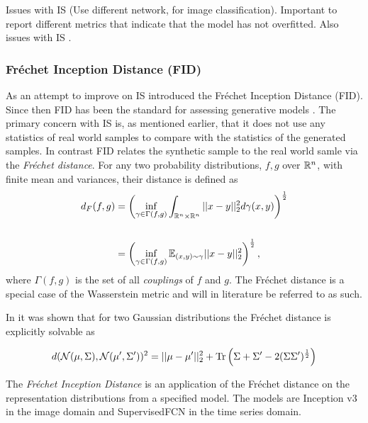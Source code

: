 \documentclass[../../thesis.tex]{subfiles}
\begin{document}
Issues with IS \cite{barratt2018note} (Use different network, for image classification).  Important to report different metrics that indicate that the model has not overfitted. 
Also issues with IS \cite{borji2021pros}.\newline

\subsubsection{Fréchet Inception Distance (FID)}
As an attempt to improve on IS \cite{heusel2018gans} introduced the Fréchet Inception Distance (FID). Since then FID has been the standard for assessing generative models \cite{borji2021pros}.\newline
The primary concern with IS is, as mentioned earlier, that it does not use any statistics of real world samples to compare with the statistics of the generated samples. In contrast FID relates the synthetic sample to the real world samle via the \textit{Fréchet distance}. For any two probability distributions, $f,g$ over $\mathbb{R}^n$, with finite mean and variances, their  distance is defined as 
\begin{equation}
    \begin{aligned}
        d_F(f,g) &= \left(\inf_{\gamma \in \Gamma(f,g)} \int_{\mathbb{R}^n\times\mathbb{R}^n}||x-y||_2^2d\gamma(x,y) \right)^{\frac{1}{2}}\\\\
            &= \left(\inf_{\gamma \in \Gamma(f,g)} \mathbb{E}_{(x,y)\sim \gamma} ||x-y||_2^2\right)^{\frac{1}{2}},
    \end{aligned}
\end{equation}
where $\Gamma(f,g)$ is the set of all \textit{couplings} of $f$ and $g$. The Fréchet distance is a special case of the Wasserstein metric and will in literature be referred to as such.\newline 

In \cite{DOWSON1982450} it was shown that for two Gaussian distributions the Fréchet distance is explicitly solvable as

\begin{equation}
    \label{eq:FID Gaussian}
    d(\mathcal{N}(\mu,\Sigma),\mathcal{N}(\mu',\Sigma'))^2 = ||\mu-\mu'||_2^2 + \operatorname{Tr} \left( \Sigma + \Sigma' - 2(\Sigma\Sigma')^{\frac12}\right)
\end{equation}

The \textit{Fréchet Inception Distance} is an application of the Fréchet distance on the representation distributions from a specified model. The models are Inception v3 in the image domain and SupervisedFCN in the time series domain.\newline
\end{document}
